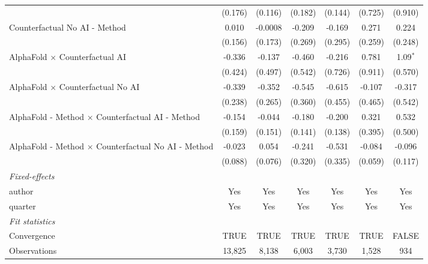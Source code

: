 \begin{tabular}{lcccccc}
                                                              & (0.176) & (0.116) & (0.182) & (0.144) & (0.725) & (0.910)\\   
   Counterfactual No AI - Method                              & 0.010   & -0.0008 & -0.209  & -0.169  & 0.271   & 0.224\\   
                                                              & (0.156) & (0.173) & (0.269) & (0.295) & (0.259) & (0.248)\\   
   AlphaFold $\times$ Counterfactual AI                       & -0.336  & -0.137  & -0.460  & -0.216  & 0.781   & 1.09$^{*}$\\   
                                                              & (0.424) & (0.497) & (0.542) & (0.726) & (0.911) & (0.570)\\   
   AlphaFold $\times$ Counterfactual No AI                    & -0.339  & -0.352  & -0.545  & -0.615  & -0.107  & -0.317\\   
                                                              & (0.238) & (0.265) & (0.360) & (0.455) & (0.465) & (0.542)\\   
   AlphaFold - Method $\times$ Counterfactual AI - Method     & -0.154  & -0.044  & -0.180  & -0.200  & 0.321   & 0.532\\   
                                                              & (0.159) & (0.151) & (0.141) & (0.138) & (0.395) & (0.500)\\   
   AlphaFold - Method $\times$ Counterfactual No AI - Method  & -0.023  & 0.054   & -0.241  & -0.531  & -0.084  & -0.096\\   
                                                              & (0.088) & (0.076) & (0.320) & (0.335) & (0.059) & (0.117)\\   
   \midrule
   \emph{Fixed-effects}\\
   author                                                     & Yes     & Yes     & Yes     & Yes     & Yes     & Yes\\  
   quarter                                                    & Yes     & Yes     & Yes     & Yes     & Yes     & Yes\\  
   \midrule
   \emph{Fit statistics}\\
   Convergence                                                &TRUE     & TRUE    & TRUE    & TRUE    & TRUE    & FALSE\\  
   Observations                                               & 13,825  & 8,138   & 6,003   & 3,730   & 1,528   & 934\\  

\end{tabular}

